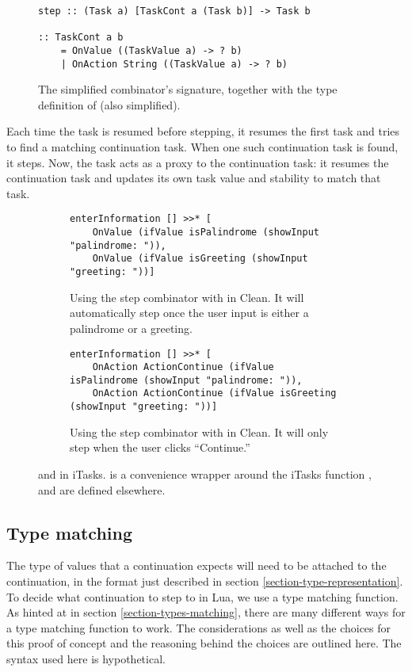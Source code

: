 \begin{figure}[ht]
\centering
\begin{verbatim}
step :: (Task a) [TaskCont a (Task b)] -> Task b

:: TaskCont a b
    = OnValue ((TaskValue a) -> ? b)
    | OnAction String ((TaskValue a) -> ? b)
\end{verbatim}
\caption{The simplified  combinator's signature, together with the type definition of  (also simplified).}
\label{lst:clean_step}
\end{figure}

Each time the  task is resumed before stepping, it resumes the first task and tries to find a matching continuation task. When one such continuation task is found, it steps. Now, the  task acts as a proxy to the continuation task: it resumes the continuation task and updates its own task value and stability to match that task.

\begin{figure}[ht]
\begin{subfigure}{\textwidth}
\centering
\begin{verbatim}
enterInformation [] >>* [
    OnValue (ifValue isPalindrome (showInput "palindrome: ")),
    OnValue (ifValue isGreeting (showInput "greeting: "))]
\end{verbatim}
\caption{Using the step combinator with  in Clean. It will automatically step once the user input is either a palindrome or a greeting.}
\label{lst:clean_step_onvalue}
\end{subfigure}
\begin{subfigure}{\textwidth}
\centering
\bigskip
\begin{verbatim}
enterInformation [] >>* [
	OnAction ActionContinue (ifValue isPalindrome (showInput "palindrome: ")),
	OnAction ActionContinue (ifValue isGreeting (showInput "greeting: "))]
\end{verbatim}
\caption{Using the step combinator with  in Clean. It will only step when the user clicks ``Continue.''}
\label{lst:clean_step_onaction}
\end{subfigure}
\caption{ and  in iTasks.  is a convenience wrapper around the iTasks function ,  and  are defined elsewhere.}
\label{lst:clean_step_onvalue_onaction}
\end{figure}

\subsection{Type matching}\label{section-combinators-type-matching}
The type of values that a continuation expects will need to be attached to the continuation, in the format just described in section \ref{section-type-representation}. To decide what continuation to step to in Lua, we use a type matching function. As hinted at in section \ref{section-types-matching}, there are many different ways for a type matching function to work. The considerations as well as the choices for this proof of concept and the reasoning behind the choices are outlined here. The syntax used here is hypothetical.

